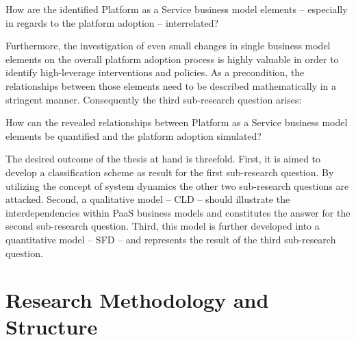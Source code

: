 \begin{SRQ}\label{srq2}
How are the identified Platform as a Service business model elements -- especially in regards to the platform adoption -- interrelated?
\end{SRQ}

Furthermore, the investigation of even small changes in single business model elements on the overall platform adoption process is highly valuable in order to identify high-leverage interventions and policies. As a precondition, the relationships between those elements need to be described mathematically in a stringent manner. Consequently the third sub-research question arises:

\begin{SRQ}\label{srq3}
How can the revealed relationships between Platform as a Service business model elements be quantified and the platform adoption simulated?
\end{SRQ}

The desired outcome of the thesis at hand is threefold. First, it is aimed to develop a classification scheme as result for the first sub-research question. By utilizing the concept of system dynamics the other two sub-research questions are attacked. Second, a qualitative model -- \acf{CLD} -- should illustrate the interdependencies within \ac{PaaS} business models and constitutes the answer for the second sub-research question. Third, this model is further developed into a quantitative model -- \acf{SFD} -- and represents the result of the third sub-research question.
	
\section{Research Methodology and Structure}\label{ch:intro:met}

